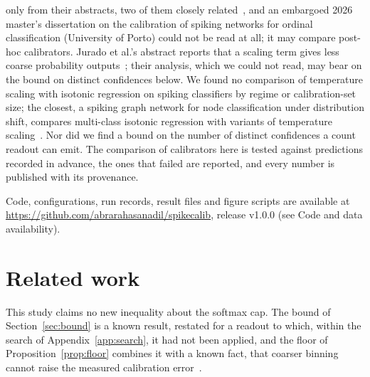 \documentclass[10pt]{article}
\begin{document}
only from their abstracts, two of them closely related~\citep{jurado2023spikemoid,banteywalu2026trustworthy}, and an embargoed
2026 master's dissertation on the calibration of spiking networks for ordinal classification
(University of Porto) could not be read at all; it may compare post-hoc calibrators. Jurado et
al.'s abstract reports that a scaling term gives less coarse probability outputs~\citep{jurado2023spikemoid}; %
their analysis, which we could not read, may bear on the bound on distinct confidences below. We
found no comparison of temperature scaling with isotonic regression on spiking classifiers by
regime or calibration-set size; the closest, a spiking graph network for node classification under
distribution shift, compares multi-class isotonic regression with variants of temperature
scaling~\citep{ren2026sight}. Nor did we find a bound on the number of distinct confidences a %
count readout can emit. The comparison of calibrators here is tested against predictions recorded in
advance, the ones that failed are reported, and every number is published with its provenance.

Code, configurations, run records, result files and figure scripts are available at
\url{https://github.com/abrarahasanadil/spikecalib}, release v1.0.0
(see Code and data availability).

\section{Related work}
\label{sec:related}

This study claims no new inequality about the softmax cap. The bound of Section~\ref{sec:bound} is a known result,
restated for a readout to which, within the search of Appendix~\ref{app:search}, it had not been applied, and the floor of
Proposition~\ref{prop:floor} combines it with a known fact, that coarser binning cannot raise the
measured calibration error~\citep{kumar2019verified}. %
\end{document}
